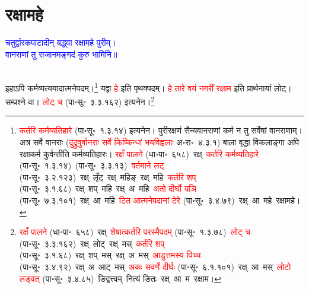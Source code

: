 \section[रक्षामहे]{रक्षामहे}
\centering\textcolor{blue}{चतुर्द्वारकपाटादीन् बद्ध्वा रक्षामहे पुरीम्।\nopagebreak\\
वानराणां तु राजानमङ्गदं कुरु भामिनि॥}\nopagebreak\\
\\
\fontsize{14}{21}\selectfont\begin{sloppypar}\justifying\noindent\hspace{10mm} इहाऽपि कर्म\-व्यत्ययादात्मनेपदम्।\footnote{\textcolor{red}{कर्तरि कर्म\-व्यतिहारे} (पा॰सू॰~१.३.१४) इत्यनेन। पुरीरक्षणं सैन्यवानराणां कर्म न तु सर्वेषां वानराणाम्। अत्र सर्वे वानराः (\textcolor{red}{दुद्रुवुर्वानराः सर्वे किष्किन्धां भयविह्वलाः} अ॰रा॰~४.३.१) बाला वृद्धा विकलाङ्गा अपि रक्षाकर्म कुर्वन्तीति कर्मव्यतिहारः। \textcolor{red}{रक्षँ पालने} (धा॰पा॰~६५८)~\arrow रक्ष्~\arrow \textcolor{red}{कर्तरि कर्म\-व्यतिहारे} (पा॰सू॰~१.३.१४)~\arrow (पा॰सू॰~३.३.१३)~\arrow \textcolor{red}{वर्तमाने लट्} (पा॰सू॰~३.२.१२३)~\arrow रक्ष्~लृँट्~\arrow रक्ष्~महिङ्~\arrow रक्ष्~महि~\arrow \textcolor{red}{कर्तरि शप्‌} (पा॰सू॰~३.१.६८)~\arrow रक्ष्~शप्~महि~\arrow रक्ष्~अ~महि~\arrow \textcolor{red}{अतो दीर्घो यञि} (पा॰सू॰~७.३.१०१)~\arrow रक्ष्~आ~महि~\arrow \textcolor{red}{टित आत्मनेपदानां टेरे} (पा॰सू॰~३.४.७९)~\arrow रक्ष्~आ~महे~\arrow रक्षामहे।} यद्वा \textcolor{red}{हे} इति पृथक्पदम्। \textcolor{red}{हे तारे वयं नगरीं रक्षाम} इति प्रार्थनायां लोट्। सम्प्रश्ने वा। \textcolor{red}{लोट् च} (पा॰सू॰~३.३.१६२) इत्यनेन।\footnote{\textcolor{red}{रक्षँ पालने} (धा॰पा॰~६५८)~\arrow रक्ष्~\arrow \textcolor{red}{शेषात्कर्तरि परस्मैपदम्} (पा॰सू॰~१.३.७८)~\arrow \textcolor{red}{लोट् च} (पा॰सू॰~३.३.१६२)~\arrow रक्ष्~लोट्~\arrow रक्ष्~मस्~\arrow \textcolor{red}{कर्तरि शप्‌} (पा॰सू॰~३.१.६८)~\arrow रक्ष्~शप्~मस्~\arrow रक्ष्~अ~मस्~\arrow \textcolor{red}{आडुत्तमस्य पिच्च} (पा॰सू॰~३.४.९२)~\arrow रक्ष्~अ~आट्~मस्~\arrow \textcolor{red}{अकः सवर्णे दीर्घः} (पा॰सू॰~६.१.१०१)~\arrow रक्ष्~आ~मस्~\arrow \textcolor{red}{लोटो लङ्वत्‌} (पा॰सू॰~३.४.८५)~\arrow ङिद्वत्त्वम्~\arrow नित्यं ङितः~\arrow रक्ष्~आ~म~\arrow रक्षाम।}\end{sloppypar}
